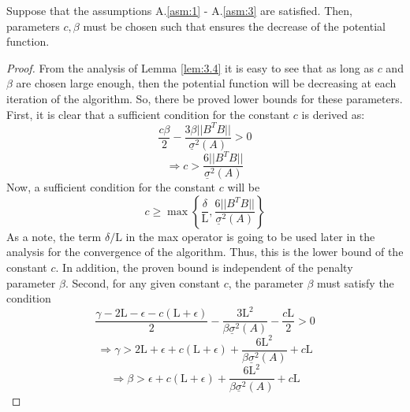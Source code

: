     \begin{corollary}\label{cor:3.1}
        Suppose that the assumptions A.\ref{asm:1} - A.\ref{asm:3} are satisfied. Then, parameters $c,\beta$ must be chosen such that ensures the decrease of the potential function.
    \end{corollary}
    \begin{proof}
        From the analysis of Lemma \ref{lem:3.4} it is easy to see that as long as $c$ and $\beta$ are chosen large enough, then the potential function will be decreasing at each iteration of the algorithm. So, there be proved lower bounds for these parameters.
        First, it is clear that a sufficient condition for the constant $c$ is derived as:
        \begin{equation*}
            \frac{c\beta}{2} - \frac{3\beta ||B^TB||}{\underline{\sigma}^2(A)} > 0
        \end{equation*}
        \begin{equation*}
            \Rightarrow c > \frac{6||B^TB||}{\underline{\sigma}^2(A)}
        \end{equation*}
        Now, a sufficient condition for the constant $c$ will be 
        \begin{equation}\label{eq:3.2.21}
            c \geq \max \left\{ \frac{\delta}{\mathrm{L}}, \frac{6||B^TB||}{\underline{\sigma}^2(A)} \right\}
        \end{equation}
        As a note, the term $\delta/\mathrm{L}$ in the max operator is going to be used later in the analysis for the convergence of the algorithm. Thus, this is the lower bound of the constant $c$. In addition, the proven bound is independent of the penalty parameter $\beta$.
        Second, for any given constant $c$, the parameter $\beta$ must satisfy the condition
        \begin{equation*}
            \frac{\gamma - 2\mathrm{L} - \epsilon - c(\mathrm{L} + \epsilon)}{2} - \frac{3\mathrm{L}^2}{\beta \underline{\sigma}^2(A)} - \frac{c\mathrm{L}}{2} > 0
        \end{equation*}
        \begin{equation*}
            \Rightarrow \gamma > 2\mathrm{L} + \epsilon +c(\mathrm{L} + \epsilon) + \frac{6\mathrm{L}^2}{\beta\underline{\sigma}^2(A)} + c\mathrm{L}
        \end{equation*}
        \begin{equation*}
            \Rightarrow \beta > \epsilon +c(\mathrm{L} + \epsilon) + \frac{6\mathrm{L}^2}{\beta\underline{\sigma}^2(A)} + c\mathrm{L}

\end{equation*}
\end{proof}

